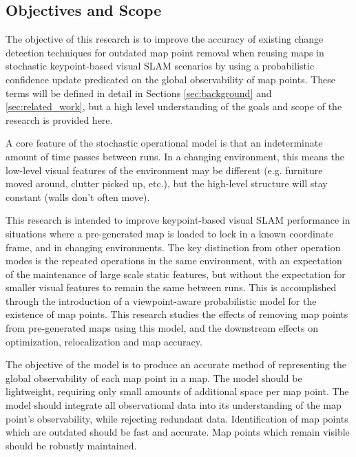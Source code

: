 \subsection{Objectives and Scope}
\label{objectives}

The objective of this research is to improve the accuracy of existing change detection techniques for outdated map point removal when reusing maps in stochastic keypoint-based visual SLAM scenarios by using a probabilistic confidence update predicated on the global observability of map points. These terms will be defined in detail in Sections \ref{sec:background} and \ref{sec:related_work}, but a high level understanding of the goals and scope of the research is provided here.

A core feature of the stochastic operational model is that an indeterminate amount of time passes between runs. In a changing environment, this means the low-level visual features of the environment may be different (e.g. furniture moved around, clutter picked up, etc.), but the high-level structure will stay constant (walls don't often move). 




This research is intended to improve keypoint-based visual SLAM performance in situations where a pre-generated map is loaded to lock in a known coordinate frame, and in changing environments. The key distinction from other operation modes is the repeated operations in the same environment, with an expectation of the maintenance of large scale static features, but without the expectation for smaller visual features to remain the same between runs. This is accomplished through the introduction of a viewpoint-aware probabilistic model for the existence of map points. This research studies the effects of removing map points from pre-generated maps using this model, and the downstream effects on optimization, relocalization and map accuracy.


The objective of the model is to produce an accurate method of representing the global observability of each map point in a map. The model should be lightweight, requiring only small amounts of additional space per map point. The model should integrate all observational data into its understanding of the map point's observability, while rejecting redundant data. Identification of map points which are outdated should be fast and accurate. Map points which remain visible should be robustly maintained.


